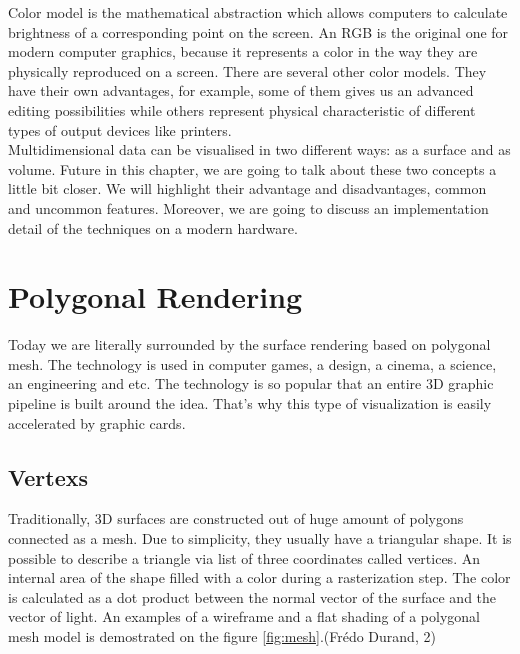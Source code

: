 \documentclass[twoside, english, 11pt]{report}
\begin{document}
Color model is the mathematical abstraction which allows computers to calculate brightness of a corresponding point on the screen. An RGB is the original one for modern computer graphics, because it represents a color in the way they are physically reproduced on a screen. There are several other color models. They have their own advantages, for example, some of them gives us an advanced editing possibilities while others represent physical characteristic of different types of output devices like printers.\\

Multidimensional data can be visualised in two different ways: as a surface and as volume. Future in this chapter, we are going to talk about these two concepts a little bit closer. We will highlight their advantage and disadvantages, common and uncommon features. Moreover, we are going to discuss an implementation detail of the techniques on a modern hardware.


\section{Polygonal Rendering}

Today we are literally surrounded by the surface rendering based on polygonal mesh. The technology is used in computer games, a design, a cinema, a science, an engineering and etc. The technology is so popular that an entire 3D graphic pipeline is built around the idea. That's why this type of visualization is easily accelerated by graphic cards.\\

\subsection{Vertexs}
Traditionally, 3D surfaces are constructed out of huge amount of polygons connected as a mesh. Due to simplicity, they usually have a triangular shape. It is possible to describe a triangle via list of three coordinates called vertices. An internal area of the shape filled with a color during a rasterization step. The color is calculated as a dot product between the normal vector of the surface and the vector of light. An examples of a wireframe and a flat shading of a polygonal mesh model is demostrated on the figure \ref{fig:mesh}.(Frédo Durand, 2)
\end{document}
